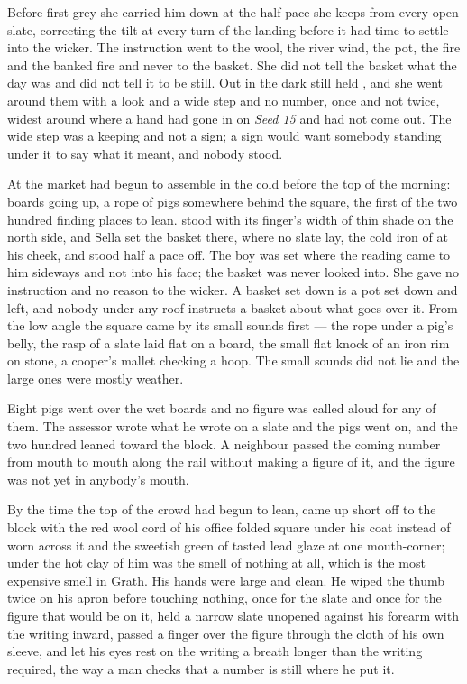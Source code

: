 Before first grey she carried him down  at the half-pace she keeps from every open slate, correcting the tilt at every turn of the landing before it had time to settle into the wicker. The instruction went to the wool, the river wind, the pot, the fire and the banked fire and never to the basket. She did not tell the basket what the day was and did not tell it to be still. Out in  the dark still held , and she went around them with a look and a wide step and no number, once and not twice, widest around  where a hand had gone in on \emph{Seed 15} and had not come out. The wide step was a keeping and not a sign; a sign would want somebody standing under it to say what it meant, and nobody stood.

At  the market had begun to assemble in the cold before the top of the morning: boards going up, a rope of pigs somewhere behind the square, the first of the two hundred finding places to lean.  stood with its finger's width of thin shade on the north side, and Sella set the basket there, where no slate lay, the cold iron of  at his cheek, and stood half a pace off. The boy was set where the reading came to him sideways and not into his face; the basket was never looked into. She gave no instruction and no reason to the wicker. A basket set down is a pot set down and left, and nobody under any roof instructs a basket about what goes over it. From the low angle the square came by its small sounds first --- the rope under a pig's belly, the rasp of a slate laid flat on a board, the small flat knock of an iron rim on stone, a cooper's mallet checking a hoop. The small sounds did not lie and the large ones were mostly weather.

\scenebreak

Eight pigs went over the wet boards and no figure was called aloud for any of them. The assessor wrote what he wrote on a slate and the pigs went on, and the two hundred leaned toward the block. A neighbour passed the coming number from mouth to mouth along the rail without making a figure of it, and the figure was not yet in anybody's mouth.

By the time the top of the crowd had begun to lean,  came up short off  to the block with the red wool cord of his office folded square under his coat instead of worn across it and the sweetish green of tasted lead glaze at one mouth-corner; under the hot clay of him was the smell of nothing at all, which is the most expensive smell in Grath. His hands were large and clean. He wiped the thumb twice on his apron before touching nothing, once for the slate and once for the figure that would be on it, held a narrow slate unopened against his forearm with the writing inward, passed a finger over the figure through the cloth of his own sleeve, and let his eyes rest on the writing a breath longer than the writing required, the way a man checks that a number is still where he put it.

